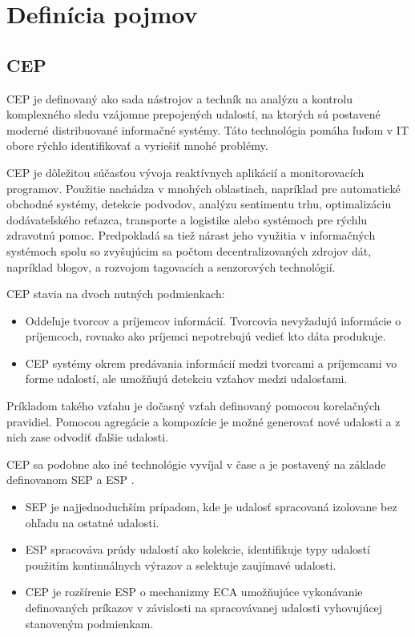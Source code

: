 \chapter{Definícia pojmov}
\label{chap:pojmy}

\section{CEP}
	\ac{CEP} je definovaný ako sada nástrojov a techník na analýzu a kontrolu komplexného sledu vzájomne prepojených udalostí, na ktorých sú postavené moderné distribuované informačné systémy. Táto technológia pomáha ľuďom v IT obore rýchlo identifikovať a vyriešiť mnohé problémy. \cite{power-of-events}

	\ac{CEP} je dôležitou súčasťou vývoja reaktívnych aplikácií a monitorovacích programov. Použitie nachádza v mnohých oblastiach, napríklad pre automatické obchodné systémy, detekcie podvodov, analýzu sentimentu trhu, optimalizáciu dodávateľského reťazca, transporte a logistike alebo systémoch pre rýchlu zdravotnú pomoc. Predpokladá sa tiež nárast jeho využitia v informačných systémoch spolu so zvyšujúcim sa počtom decentralizovaných zdrojov dát, napríklad blogov, a rozvojom tagovacích a senzorových technológií.

	\ac{CEP} stavia na dvoch nutných podmienkach: \cite{web:cep-editorial}
	\begin{itemize}
		\item Oddeľuje tvorcov a príjemcov informácií. Tvorcovia nevyžadujú informácie o príjemcoch, rovnako ako príjemci nepotrebujú vedieť kto dáta produkuje.
		\item CEP systémy okrem predávania informácií medzi tvorcami a príjemcami vo forme udalostí, ale umožňujú detekciu vzťahov medzi udalosťami.
	\end{itemize}
	
	Príkladom takého vzťahu je dočasný vzťah definovaný pomocou korelačných pravidiel. Pomocou agregácie a kompozície je možné generovať nové udalosti a z nich zase odvodiť ďalšie udalosti. 
	
	\ac{CEP} sa podobne ako iné technológie vyvíjal v čase a je postavený na základe definovanom \ac{SEP} a \ac{ESP} \cite{cepsep}.
	\begin{itemize}
		\item SEP je najjednoduchším prípadom, kde je udalosť spracovaná izolovane bez ohľadu na ostatné udalosti.
		\item ESP spracováva prúdy udalostí ako kolekcie, identifikuje typy udalostí použitím kontinuálnych výrazov a selektuje zaujímavé udalosti.
		\item CEP je rozšírenie ESP o mechanizmy \ac{ECA} umožňujúce vykonávanie definovaných príkazov v závislosti na spracovávanej udalosti vyhovujúcej stanoveným podmienkam.
	\end{itemize}
	
